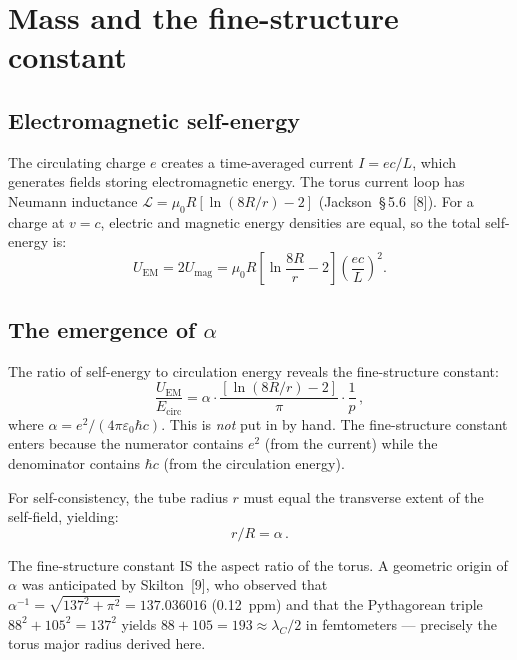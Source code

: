 \documentclass[10pt,twoside,a5paper]{article}
\begin{document}
\section{Mass and the fine-structure constant}

\subsection{Electromagnetic self-energy}

The circulating charge $e$ creates a time-averaged current $I = ec/L$, which generates fields storing electromagnetic energy. The torus current loop has Neumann inductance $\mathcal{L} = \mu_0 R[\ln(8R/r) - 2]$ (Jackson~\S\,5.6~[8]). For a charge at $v = c$, electric and magnetic energy densities are equal, so the total self-energy is:
\begin{equation}
  U_{\text{EM}} = 2U_{\text{mag}} = \mu_0 R\!\left[\ln\frac{8R}{r} - 2\right]\!\left(\frac{ec}{L}\right)^{\!2}.
\end{equation}

\subsection{The emergence of $\alpha$}

The ratio of self-energy to circulation energy reveals the fine-structure constant:
\begin{equation}
  \frac{U_{\text{EM}}}{E_{\text{circ}}} = \alpha\cdot\frac{[\ln(8R/r) - 2]}{\pi} \cdot \frac{1}{p}\,,
\end{equation}
where $\alpha = e^2/(4\pi\varepsilon_0\hbar c)$. This is \emph{not} put in by hand. The fine-structure constant enters because the numerator contains $e^2$ (from the current) while the denominator contains $\hbar c$ (from the circulation energy).

For self-consistency, the tube radius $r$ must equal the transverse extent of the self-field, yielding:
\begin{equation}
  r/R = \alpha\,.
\end{equation}

The fine-structure constant IS the aspect ratio of the torus. A geometric origin of $\alpha$ was anticipated by Skilton~[9], who observed that $\alpha^{-1} = \sqrt{137^2 + \pi^2} = 137.036016$ (0.12~ppm) and that the Pythagorean triple $88^2 + 105^2 = 137^2$ yields $88 + 105 = 193 \approx \lambda_C/2$ in femtometers --- precisely the torus major radius derived here.
\end{document}
